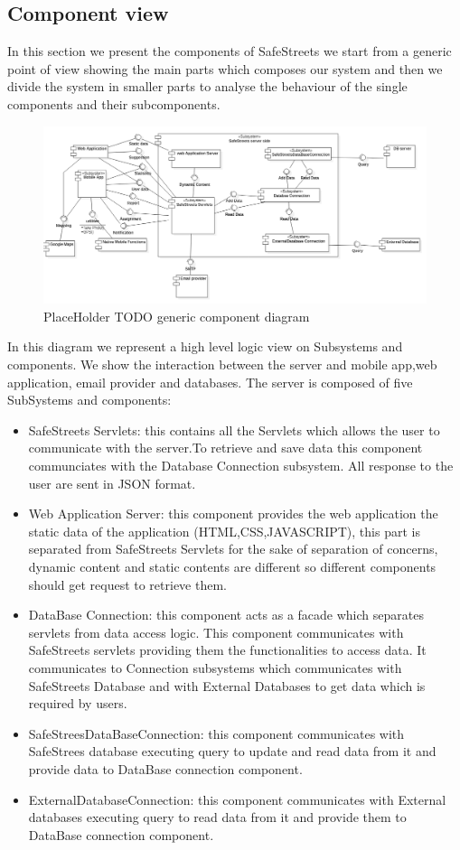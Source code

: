 \subsection{Component view}
In this section we present the components of SafeStreets we start from a generic point of view showing the main parts which composes our system and then we divide the system in smaller parts to analyse the behaviour of the single components and their subcomponents.
\newline
\begin{figure}[H]
\centering
\includegraphics[width=\textwidth]{Images/GenericComponentDiagram.png}
\caption{\label{fig:ComWI}PlaceHolder TODO generic component diagram}
\end{figure}
In this diagram we represent a high level logic view on Subsystems and components. We show the interaction between the server and mobile app,web application, email provider and databases.
The server is composed of five SubSystems and components:
\begin{itemize}
\item SafeStreets Servlets: this contains all the Servlets which allows the user to communicate with the server.To retrieve and save data this component communciates with the Database Connection subsystem. All response to the user are sent in JSON format. 
\item Web Application Server: this component provides the web application the static data of the application (HTML,CSS,JAVASCRIPT), this part is separated from SafeStreets Servlets for the sake of separation of concerns, dynamic content and static contents are different so different components should get request to retrieve them.
\item DataBase Connection: this component acts as a facade which separates servlets from data access logic. This component communicates with SafeStreets servlets providing them the functionalities to access data.
It communicates to Connection subsystems which communicates with SafeStreets Database and with External Databases to get data which is required by users.
\item SafeStreesDataBaseConnection: this component communicates with SafeStrees database executing query to update and read data from it and provide data to DataBase connection component. 
\item ExternalDatabaseConnection: this component communicates with External databases executing query to read data from it and provide them to DataBase connection component.
\end{itemize}
